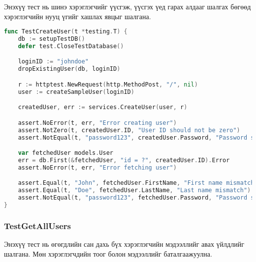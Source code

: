 Энэхүү тест нь шинэ хэрэглэгчийг үүсгэж, үүсгэх үед гарах алдааг шалгах бөгөөд хэрэглэгчийн нууц үгийг хашлах явцыг шалгана.

\begin{lstlisting}[language=Go, caption=Test Create User Function, frame=single]
func TestCreateUser(t *testing.T) {
    db := setupTestDB()
    defer test.CloseTestDatabase()

    loginID := "johndoe"
    dropExistingUser(db, loginID)

    r := httptest.NewRequest(http.MethodPost, "/", nil)
    user := createSampleUser(loginID)

    createdUser, err := services.CreateUser(user, r)

    assert.NoError(t, err, "Error creating user")
    assert.NotZero(t, createdUser.ID, "User ID should not be zero")
    assert.NotEqual(t, "password123", createdUser.Password, "Password should be hashed")

    var fetchedUser models.User
    err = db.First(&fetchedUser, "id = ?", createdUser.ID).Error
    assert.NoError(t, err, "Error fetching user")

    assert.Equal(t, "John", fetchedUser.FirstName, "First name mismatch")
    assert.Equal(t, "Doe", fetchedUser.LastName, "Last name mismatch")
    assert.NotEqual(t, "password123", fetchedUser.Password, "Password should be hashed")
}
\end{lstlisting}

\subsubsection{TestGetAllUsers}

Энэхүү тест нь өгөгдлийн сан дахь бүх хэрэглэгчийн мэдээллийг авах үйлдлийг шалгана. Мөн хэрэглэгчдийн тоог болон мэдээллийг баталгаажуулна.

